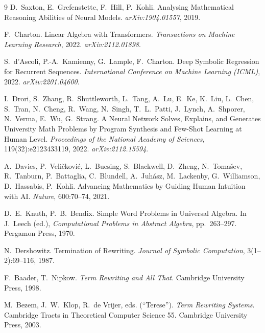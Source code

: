 \documentclass[11pt]{article}
\numberwithin{equation}{section}
\begin{document}
\begin{thebibliography}{9}
D.~Saxton, E.~Grefenstette, F.~Hill, P.~Kohli.
\newblock Analysing Mathematical Reasoning Abilities of Neural Models.
\newblock \emph{arXiv:1904.01557}, 2019.

F.~Charton.
\newblock Linear Algebra with Transformers.
\newblock \emph{Transactions on Machine Learning Research}, 2022. \emph{arXiv:2112.01898}.

S.~d'Ascoli, P.-A.~Kamienny, G.~Lample, F.~Charton.
\newblock Deep Symbolic Regression for Recurrent Sequences.
\newblock \emph{International Conference on Machine Learning (ICML)}, 2022. \emph{arXiv:2201.04600}.

I.~Drori, S.~Zhang, R.~Shuttleworth, L.~Tang, A.~Lu, E.~Ke, K.~Liu, L.~Chen, S.~Tran, N.~Cheng, R.~Wang, N.~Singh, T.~L.~Patti, J.~Lynch, A.~Shporer, N.~Verma, E.~Wu, G.~Strang.
\newblock A Neural Network Solves, Explains, and Generates University Math Problems by Program Synthesis and Few-Shot Learning at Human Level.
\newblock \emph{Proceedings of the National Academy of Sciences}, 119(32):e2123433119, 2022. \emph{arXiv:2112.15594}.

A.~Davies, P.~Veli\v{c}kovi\'{c}, L.~Buesing, S.~Blackwell, D.~Zheng, N.~Toma\v{s}ev, R.~Tanburn, P.~Battaglia, C.~Blundell, A.~Juh\'{a}sz, M.~Lackenby, G.~Williamson, D.~Hassabis, P.~Kohli.
\newblock Advancing Mathematics by Guiding Human Intuition with AI.
\newblock \emph{Nature}, 600:70--74, 2021.

D.~E.~Knuth, P.~B.~Bendix.
\newblock Simple Word Problems in Universal Algebra.
\newblock In J.~Leech (ed.), \emph{Computational Problems in Abstract Algebra}, pp.~263--297. Pergamon Press, 1970.

N.~Dershowitz.
\newblock Termination of Rewriting.
\newblock \emph{Journal of Symbolic Computation}, 3(1--2):69--116, 1987.

F.~Baader, T.~Nipkow.
\newblock \emph{Term Rewriting and All That}.
\newblock Cambridge University Press, 1998.

M.~Bezem, J.~W.~Klop, R.~de Vrijer, eds. (``Terese'').
\newblock \emph{Term Rewriting Systems}.
\newblock Cambridge Tracts in Theoretical Computer Science 55. Cambridge University Press, 2003.


\end{thebibliography}
\end{document}
